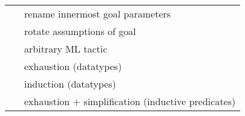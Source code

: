 \begin{isabellebody}
\begin{isamarkuptext}
\begin{tabular}{ll}
    \hyperlink{method.rename-tac}{\mbox{\isa{rename{\isacharunderscore}tac}}}~\isa{x} & rename innermost goal parameters \\
    \hyperlink{method.rotate-tac}{\mbox{\isa{rotate{\isacharunderscore}tac}}}~\isa{n} & rotate assumptions of goal \\
    \hyperlink{method.tactic}{\mbox{\isa{tactic}}}~\isa{{\isachardoublequote}text{\isachardoublequote}} & arbitrary ML tactic \\
    \hyperlink{method.case-tac}{\mbox{\isa{case{\isacharunderscore}tac}}}~\isa{t} & exhaustion (datatypes) \\
    \hyperlink{method.induct-tac}{\mbox{\isa{induct{\isacharunderscore}tac}}}~\isa{x} & induction (datatypes) \\
    \hyperlink{method.ind-cases}{\mbox{\isa{ind{\isacharunderscore}cases}}}~\isa{t} & exhaustion + simplification (inductive predicates) \\
  \end{tabular}%
\end{isamarkuptext}%
\isamarkuptrue%
%
\isadelimtheory
%
\endisadelimtheory
%
\isatagtheory
{}\isamarkupfalse%
%
\endisatagtheory
{\isafoldtheory}%
%
\isadelimtheory
%
\endisadelimtheory
\isanewline
\end{isabellebody}%
